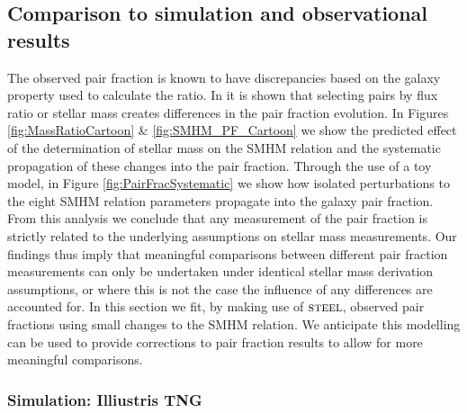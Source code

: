\subsection{Comparison to simulation and observational results}
\label{subsec:SimObsRes}
The observed pair fraction is known to have discrepancies based on the galaxy property used to calculate the ratio. In \citet{Man2016RESOLVING03} it is shown that selecting pairs by flux ratio or stellar mass creates differences in the pair fraction evolution. 
In Figures \ref{fig:MassRatioCartoon} \& \ref{fig:SMHM_PF_Cartoon} we show the predicted effect of the determination of stellar mass on the SMHM relation and the systematic propagation of these changes into the pair fraction. 
Through the use of a toy model, in Figure \ref{fig:PairFracSystematic} we show how isolated perturbations to the eight SMHM relation parameters propagate into the galaxy pair fraction.
From this analysis we conclude that any measurement of the pair fraction is strictly related to the underlying assumptions on stellar mass measurements. 
Our findings thus imply that meaningful comparisons between different pair fraction measurements can only be undertaken under identical stellar mass derivation assumptions, or where this is not the case the influence of any differences are accounted for.
In this section we fit, by making use of $\textsc{steel}$, observed pair fractions using small changes to the SMHM relation.
We anticipate this modelling can be used to provide corrections to pair fraction results to allow for more meaningful comparisons.

\subsubsection{Simulation: Illiustris TNG}


